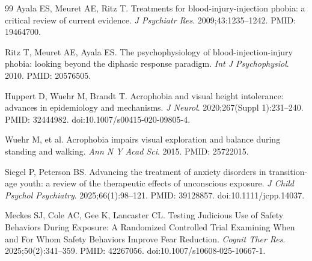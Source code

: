 \documentclass[9pt,twocolumn]{article}
\begin{document}
\begin{thebibliography}{99}
Ayala ES, Meuret AE, Ritz T. Treatments for blood-injury-injection phobia: a critical review of current evidence. \emph{J Psychiatr Res}. 2009;43:1235--1242. PMID: 19464700.

Ritz T, Meuret AE, Ayala ES. The psychophysiology of blood-injection-injury phobia: looking beyond the diphasic response paradigm. \emph{Int J Psychophysiol}. 2010. PMID: 20576505.

Huppert D, Wuehr M, Brandt T. Acrophobia and visual height intolerance: advances in epidemiology and mechanisms. \emph{J Neurol}. 2020;267(Suppl 1):231--240. PMID: 32444982. doi:10.1007/s00415-020-09805-4.

Wuehr M, et al. Acrophobia impairs visual exploration and balance during standing and walking. \emph{Ann N Y Acad Sci}. 2015. PMID: 25722015.

Siegel P, Peterson BS. Advancing the treatment of anxiety disorders in transition-age youth: a review of the therapeutic effects of unconscious exposure. \emph{J Child Psychol Psychiatry}. 2025;66(1):98--121. PMID: 39128857. doi:10.1111/jcpp.14037.

Meckes SJ, Cole AC, Gee K, Lancaster CL. Testing Judicious Use of Safety Behaviors During Exposure: A Randomized Controlled Trial Examining When and For Whom Safety Behaviors Improve Fear Reduction. \emph{Cognit Ther Res}. 2025;50(2):341--359. PMID: 42267056. doi:10.1007/s10608-025-10667-1.

\end{thebibliography}


\balance
\end{document}
